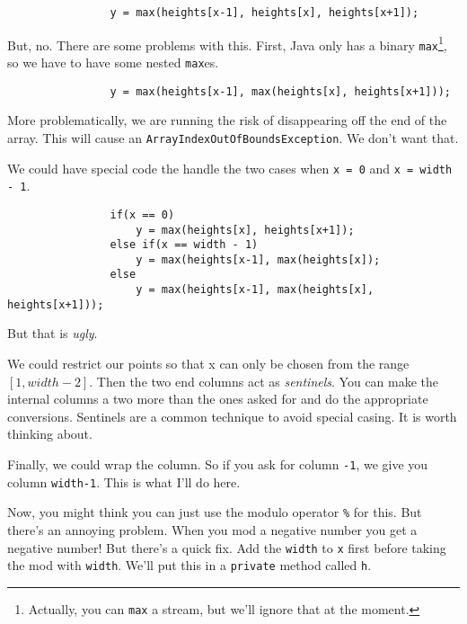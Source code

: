\documentclass{article}
\begin{document}
            \begin{verbatim}
                y = max(heights[x-1], heights[x], heights[x+1]);
            \end{verbatim}
            
            But, no. There are some problems with this. First, Java only has a binary \texttt{max}\footnote{Actually, you can \texttt{max} a stream, but we'll ignore that at the moment.}, so we have to have some nested \texttt{max}es.

            \begin{verbatim}
                y = max(heights[x-1], max(heights[x], heights[x+1]));
            \end{verbatim}
            
            \newpage
            More problematically, we are running the risk of disappearing off the end of the array. This will cause an
            \texttt{ArrayIndexOutOfBoundsException}. We don't want that.
            
            We could have special code the handle the two cases when \texttt{x = 0} and \texttt{x = width - 1}.
            \begin{verbatim}
                if(x == 0)
                    y = max(heights[x], heights[x+1]);
                else if(x == width - 1)
                    y = max(heights[x-1], max(heights[x]);
                else 
                    y = max(heights[x-1], max(heights[x], heights[x+1]));
            \end{verbatim}

            But that is \emph{ugly}.
            
            We could restrict our points so that x can only be chosen from the range $[1, width-2]$. Then the two end columns act as
            \emph{sentinels}. You can make the internal columns a two more than the ones asked for and do the appropriate conversions.
            Sentinels are a common technique to avoid special casing. It is worth thinking about.
            
            Finally, we could wrap the column. So if you ask for column \texttt{-1}, we give you column \texttt{width-1}. This is what I'll
            do here.
            
            Now, you might think you can just use the modulo operator \texttt{\%} for this. But there's an annoying problem. When you mod a
            negative number you get a negative number! But there's a quick fix. Add the \texttt{width} to \texttt{x} first before taking
            the mod with \texttt{width}.  We'll put this in a \texttt{private} method called \texttt{h}.
            
\end{document}
